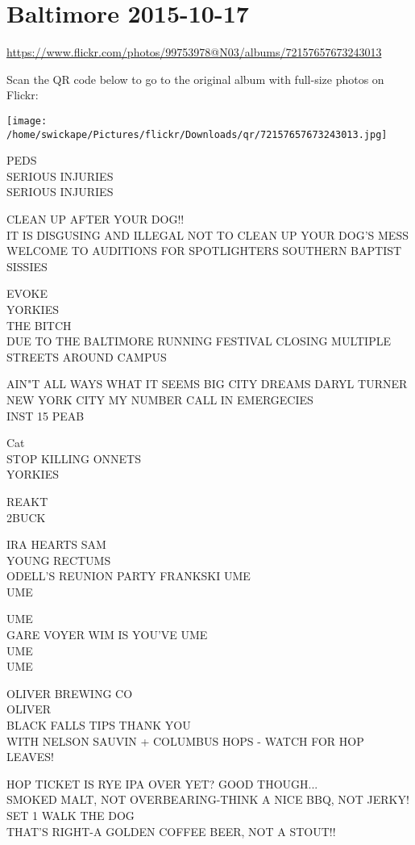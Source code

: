 \documentclass[10pt,letterpaper]{article}
\begin{document}
\section*{Baltimore 2015-10-17}

\url{https://www.flickr.com/photos/99753978@N03/albums/72157657673243013}

Scan the QR code below to go to the original album with full-size photos on Flickr:

\texttt{[image: /home/swickape/Pictures/flickr/Downloads/qr/72157657673243013.jpg]}
\pagebreak

PEDS\\
SERIOUS INJURIES\\
SERIOUS INJURIES

CLEAN UP AFTER YOUR DOG!!\\
IT IS DISGUSING AND ILLEGAL NOT TO CLEAN UP YOUR DOG'S MESS\\
WELCOME TO AUDITIONS FOR SPOTLIGHTERS SOUTHERN BAPTIST SISSIES

EVOKE\\
YORKIES\\
THE BITCH\\
DUE TO THE BALTIMORE RUNNING FESTIVAL CLOSING MULTIPLE STREETS AROUND CAMPUS

AIN"T ALL WAYS WHAT IT SEEMS BIG CITY DREAMS DARYL TURNER NEW YORK CITY MY NUMBER CALL IN EMERGECIES\\
INST 15 PEAB

Cat\\
STOP KILLING ONNETS\\
YORKIES

REAKT\\
2BUCK

IRA HEARTS SAM\\
YOUNG RECTUMS\\
ODELL'S REUNION PARTY FRANKSKI UME\\
UME

UME\\
GARE VOYER WIM IS YOU'VE UME\\
UME\\
UME

OLIVER BREWING CO\\
OLIVER\\
BLACK FALLS TIPS THANK YOU\\
WITH NELSON SAUVIN + COLUMBUS HOPS {-} WATCH FOR HOP LEAVES!

HOP TICKET IS RYE IPA OVER YET?  GOOD THOUGH...\\
SMOKED MALT, NOT OVERBEARING{-}THINK A NICE BBQ, NOT JERKY!\\
SET 1 WALK THE DOG\\
THAT'S RIGHT{-}A GOLDEN COFFEE BEER, NOT A STOUT!!
\end{document}
